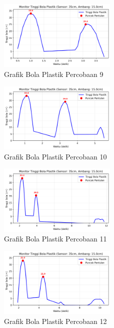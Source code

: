 \begin{figure}[htbp]
    \centering
    \includegraphics[width=0.5\textwidth]{chapters/DataPercobaan/Grafik_Bola_Plastik_9.png}
    \caption{Grafik Bola Plastik Percobaan 9}
\end{figure}
\begin{figure}[htbp]
    \centering
    \includegraphics[width=0.5\textwidth]{chapters/DataPercobaan/Grafik_Bola_Plastik_10.png}
    \caption{Grafik Bola Plastik Percobaan 10}
\end{figure}
\begin{figure}[htbp]
    \centering
    \includegraphics[width=0.5\textwidth]{chapters/DataPercobaan/Grafik_Bola_Plastik_11.png}
    \caption{Grafik Bola Plastik Percobaan 11}
\end{figure}
\begin{figure}[htbp]
    \centering
    \includegraphics[width=0.5\textwidth]{chapters/DataPercobaan/Grafik_Bola_Plastik_12.png}
    \caption{Grafik Bola Plastik Percobaan 12}
\end{figure}
